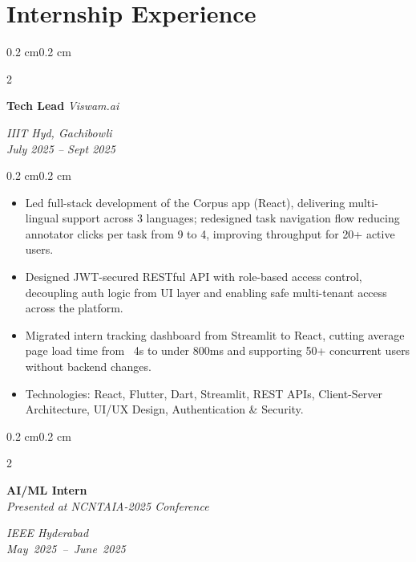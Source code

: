 \documentclass[10pt, a4paper]{article}
\newenvironment{highlights}{
    \begin{itemize}[
        topsep=0.10 cm,
        parsep=0.10 cm,
        partopsep=0pt,
        itemsep=0pt,
        leftmargin=0.4 cm + 10pt
    ]
}{\end{itemize}}
\newenvironment{onecolentry}{
    \begin{adjustwidth}{0.2 cm}{0.2 cm}
}{\end{adjustwidth}}
\newenvironment{twocolentry}[2][]{
    \onecolentry
    \def\secondColumn{#2}
    \setcolumnwidth{\fill, 4.5 cm}
    \begin{paracol}{2}
}{
    \switchcolumn \raggedleft \secondColumn
    \end{paracol}
    \endonecolentry
}
\begin{document}
\section{Internship Experience}
\begin{twocolentry}{
    \textit{IIIT Hyd, Gachibowli} \\ 
    \textit{July 2025 – Sept 2025}}
    \textbf{Tech Lead} \textit{Viswam.ai}
\end{twocolentry}

    \vspace{0.10 cm}
    \begin{onecolentry}
        \begin{highlights}
\item Led full-stack development of the Corpus app (React), delivering multi-lingual support across 3 languages; redesigned task navigation flow reducing annotator clicks per task from 9 to 4, improving throughput for 20+ active users.
\item Designed JWT-secured RESTful API with role-based access control, decoupling auth logic from UI layer and enabling safe multi-tenant access across the platform.
\item Migrated intern tracking dashboard from Streamlit to React, cutting average page load time from ~4s to under 800ms and supporting 50+ concurrent users without backend changes.
        \item Technologies: React, Flutter, Dart, Streamlit, REST APIs, Client-Server Architecture, UI/UX Design, Authentication & Security.
        \end{highlights}
    \end{onecolentry}

    \vspace{0.2 cm}

\begin{twocolentry}
  { %
    \textit{IEEE Hyderabad} \\
    \mbox{\textit{May 2025 – June 2025}}
  }
  { %
    \textbf{AI/ML Intern} \\
    \textit{Presented at NCNTAIA-2025 Conference}
  }
\end{twocolentry}
\end{document}

